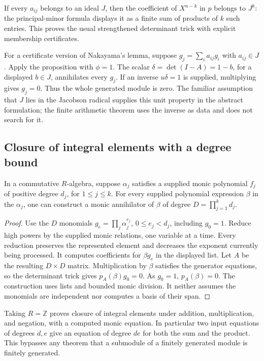 If every $a_{ij}$ belongs to an ideal $J$, then the coefficient of
$X^{n-k}$ in $p$ belongs to $J^k$: the principal-minor formula displays
it as a finite sum of products of $k$ such entries. This proves the
usual strengthened determinant trick with explicit membership
certificates.

For a certificate version of Nakayama's lemma, suppose
$g_j=\sum_i a_{ij}g_i$ with $a_{ij}\in J$. Apply the proposition with
$\phi=1$. The scalar
$\delta=\det(I-A)=1-b$, for a displayed $b\in J$, annihilates every
$g_j$. If an inverse $u\delta=1$ is supplied, multiplying gives $g_j=0$.
Thus the whole generated module is zero. The familiar assumption that
$J$ lies in the Jacobson radical supplies this unit property in the
abstract formulation; the finite arithmetic theorem uses the inverse
as data and does not search for it.

\subsection{Closure of integral elements with a degree bound}

\begin{proposition}
In a commutative $R$-algebra, suppose $\alpha_j$ satisfies a supplied
monic polynomial $f_j$ of positive degree $d_j$, for $1\leq j\leq k$.
For every supplied polynomial expression $\beta$ in the $\alpha_j$,
one can construct a monic annihilator of $\beta$ of degree
$D=\prod_{j=1}^k d_j$.
\end{proposition}
\begin{proof}
Use the $D$ monomials
$g_e=\prod_j\alpha_j^{e_j}$, $0\leq e_j<d_j$, including $g_0=1$.
Reduce high powers by the supplied monic relations, one variable at a
time. Every reduction preserves the represented element and decreases
the exponent currently being processed. It computes coefficients for
$\beta g_e$ in the displayed list. Let $A$ be the resulting $D\times D$
matrix. Multiplication by $\beta$ satisfies the generator equations,
so the determinant trick gives $p_A(\beta)g_0=0$. As $g_0=1$,
$p_A(\beta)=0$. The construction uses lists and bounded monic division.
It neither assumes the monomials are independent nor computes a basis
of their span.
\end{proof}

Taking $R=\mathbb Z$ proves closure of integral elements under addition,
multiplication, and negation, with a computed monic equation. In
particular two input equations of degrees $d,e$ give an equation of
degree $de$ for both the sum and the product. This bypasses any theorem
that a submodule of a finitely generated module is finitely generated.

